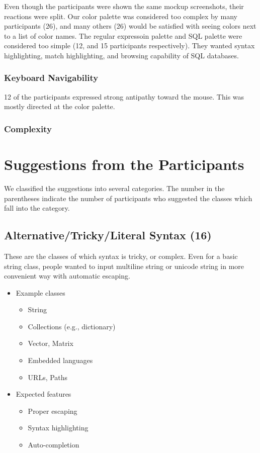 \documentclass[conference]{IEEEtran}
\begin{document}
Even though the participants were shown the same mockup screenshots, their reactions were split. Our color palette was considered too complex by many participants (26), and many others (26) would be satisfied with seeing colors next to a list of color names. The regular expressoin palette and SQL palette were considered too simple (12, and 15 participants respectively). They wanted syntax highlighting, match highlighting, and browsing capability of SQL databases.

\subsubsection{Keyboard Navigability}

12 of the participants expressed strong antipathy toward the mouse. This was mostly directed at the color palette.

\subsubsection{Complexity}


\section{Suggestions from the Participants}
We classified the suggestions into several categories. The number in the parentheses indicate the number of participants who suggested the classes which fall into the category.

\subsection{Alternative/Tricky/Literal Syntax (16)}
These are the classes of which syntax is tricky, or complex. Even for a basic string class, people wanted to input multiline string or unicode string in more convenient way with automatic escaping.

\begin{itemize}
	\item Example classes
	
	\begin{itemize}
		\item String
		\item Collections (e.g., dictionary)
		\item Vector, Matrix
		\item Embedded languages
		\item URLs, Paths
	\end{itemize}
	
	\item Expected features
	
	\begin{itemize}
		\item Proper escaping
		\item Syntax highlighting
		\item Auto-completion
	\end{itemize}
\end{itemize}
\end{document}
